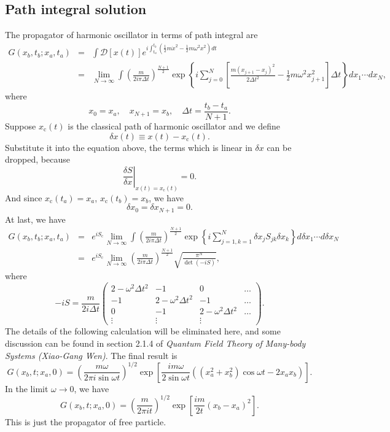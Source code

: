 \subsection{Path integral solution}
The propagator of harmonic oscillator in terms of path integral are
\begin{eqnarray}
G(x_b,t_b;x_a,t_a) &=& \int \mathcal{D}[x(t)] e^{i\int_{t_a}^{t_b} (\frac{1}{2}m\dot{x}^2 - \frac{1}{2}m\omega^2 x^2)dt} \nonumber \\
&=& \lim_{N \to \infty} \int \left(\frac{m}{2i\pi\Delta t}\right)^{\frac{N+1}{2}} \exp \left\{ i \sum_{j=0}^{N}\left[ \frac{m(x_{j+1}-x_{j})^2}{2\Delta t^2}   - \frac{1}{2}m\omega^2 x_{j+1}^2 \right] \Delta t \right\} dx_1 \cdots dx_N ,\nonumber
\end{eqnarray}
where
\[x_0 = x_a , \quad x_{N+1} = x_b , \quad \Delta t = \frac{t_b-t_a}{N+1}.\]
Suppose $x_{\mathrm{c}}(t)$ is the classical path of harmonic oscillator and we define
\[\delta x(t) \equiv x(t) - x_{\mathrm{c}}(t).\]
Substitute it into the equation above, the terms which is linear in $\delta x$ can be dropped, because
\[\left. \frac{\delta S}{\delta x} \right|_{x(t) = x_{\mathrm{c}}(t)} = 0.\]
And since $x_{\mathrm{c}}(t_a) = x_a$, $x_{\mathrm{c}}(t_b) = x_b$, we have
\[\delta x_{0} = \delta x_{N+1} = 0.\]
At last, we have
\begin{eqnarray}
G(x_b,t_b;x_a,t_a) &=& e^{iS_{\mathrm{c}}} \lim_{N \to \infty} \int \left(\frac{m}{2i\pi\Delta t}\right)^{\frac{N+1}{2}} \exp \left\{ i \sum_{j=1,k=1}^{N} \delta x_j S_{jk} \delta x_k\right\} d\delta x_1 \cdots d\delta x_N \nonumber \\
&=& e^{iS_{\mathrm{c}}} \lim_{N \to \infty} \left(\frac{m}{2i\pi\Delta t}\right)^{\frac{N+1}{2}} \sqrt{\frac{\pi^N}{\det (-iS)}}, \nonumber
\end{eqnarray}
where
\[-iS = \frac{m}{2i\Delta t} \left( \begin{matrix} 2-\omega^2\Delta t^2 & -1& 0& \ldots \\ -1& 2-\omega^2\Delta t^2& -1& \ldots \\ 0& -1& 2-\omega^2\Delta t^2& \ldots \\ \vdots & \vdots & \vdots & \end{matrix} \right).\]
The details of the following calculation will be eliminated here, and some discussion can be found in section 2.1.4 of \emph{Quantum Field Theory of Many-body Systems (Xiao-Gang Wen)}. The final result is\\
\[G(x_b,t;x_a,0) = \left ( \frac{m\omega}{2\pi i \sin \omega t} \right )^{1/2}\exp \left [ \frac{im\omega}{2\sin\omega t} \left ((x_a^2 + x_b^2)\cos\omega t - 2x_a x_b  \right ) \right ].\]
In the limit $\omega \to 0$, we have
\[G(x_b,t;x_a,0) = \left ( \frac{m}{2\pi i t} \right )^{1/2}\exp \left [ \frac{im}{2t} \left ( x_b-x_a\right)^2 \right ].\]
This is just the propagator of free particle.

